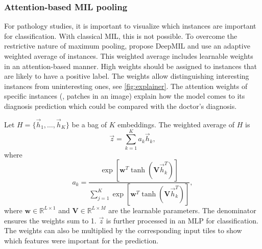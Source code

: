 \subsubsection{Attention-based MIL pooling}
For pathology studies, it is important to visualize which instances are important for classification.
With classical MIL, this is not possible.
To overcome the restrictive nature of maximum pooling, \textcite{Ilse2018} propose DeepMIL and use an adaptive weighted average of instances.
This weighted average includes learnable weights in an attention-based manner.
High weights should be assigned to instances that are likely to have a positive label.
The weights allow distinguishing interesting instances from uninteresting ones, see \cref{fig:explainer}.
The attention weights of specific instances (\eg, patches in an image) explain how the model comes to its diagnosis prediction which could be compared with the doctor's diagnosis.

Let $H=\{\vec{h}_1, \ldots, \vec{h}_K\}$ be a bag of $K$ embeddings.
The weighted average of $H$ is
\begin{equation}
    \vec{z}=\sum_{k=1}^{K}a_k\vec{h}_k,
\end{equation}
where
\begin{equation}
    a_k = \frac{\exp\left[\mathbf{w}^T \tanh (\mathbf{V}\vec{h}_k^T)\right]}{\sum_{j=1}^{K}\exp\left[\mathbf{w}^T \tanh (\mathbf{V}\vec{h}_k^T)\right]},
\end{equation}
where $\mathbf{w} \in \mathbb{R}^{L \times 1}$ and $\mathbf{V}\in \mathbb{R}^{L \times M}$ are the learnable parameters.
The denominator ensures the weights sum to 1.
$\vec{z}$ is further processed in an MLP for classification.
The weights can also be multiplied by the corresponding input tiles to show which features were important for the prediction.

\begin{figure*}
    \centering
    
    \caption[Tile importances]{
        Visualizing tile importances.
        The attention weights resulting from VarMIL are min-max-normalized and multiplied with their corresponding tile.
        The output is an attention weighted image with bright parts relating to high attention and dark parts relating to low attention.
        Note that dark tiles can still have high attentions if the original image contains dark patches with useful information.
    }
    \label{fig:explainer}
\end{figure*}

